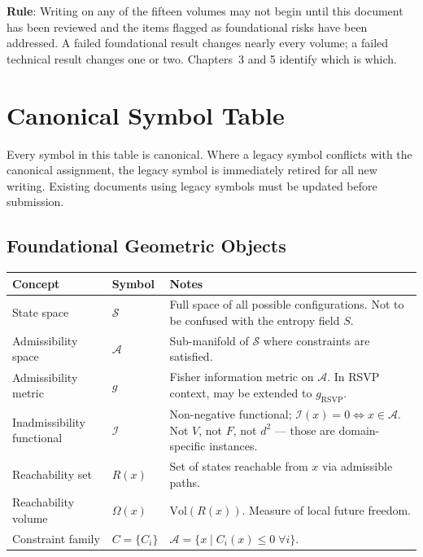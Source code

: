 \documentclass[11pt, a4paper]{book}
\theoremstyle{flyxion}
\theoremstyle{remark}
\begin{document}
\begin{warningbox}
\noindent\textbf{Rule}: Writing on any of the fifteen volumes may not
begin until this document has been reviewed and the items flagged as
foundational risks have been addressed. A failed foundational result
changes nearly every volume; a failed technical result changes one
or two. Chapters~3 and 5 identify which is which.
\end{warningbox}

\tableofcontents

\chapter{Canonical Symbol Table}

Every symbol in this table is canonical. Where a legacy symbol
conflicts with the canonical assignment, the legacy symbol is
immediately retired for all new writing. Existing documents using
legacy symbols must be updated before submission.

\section{Foundational Geometric Objects}

\medskip
\begin{longtable}{p{3.5cm}p{3cm}p{6.5cm}}
\toprule
\textbf{Concept} & \textbf{Symbol} & \textbf{Notes} \\
\midrule
State space & $\mathcal{S}$ & Full space of all possible configurations.
  Not to be confused with the entropy field $S$. \\
Admissibility space & $\mathcal{A}$ & Sub-manifold of $\mathcal{S}$
  where constraints are satisfied. \\
Admissibility metric & $g$ & Fisher information metric on $\mathcal{A}$.
  In RSVP context, may be extended to $g_\mathrm{RSVP}$. \\
Inadmissibility functional & $\mathcal{I}$ & Non-negative functional;
  $\mathcal{I}(x) = 0 \iff x \in \mathcal{A}$. Not $V$, not $F$,
  not $d^2$ — those are domain-specific instances. \\
Reachability set & $R(x)$ & Set of states reachable from $x$ via
  admissible paths. \\
Reachability volume & $\Omega(x)$ & $\mathrm{Vol}(R(x))$. Measure of
  local future freedom. \\
Constraint family & $C = \{C_i\}$ & $\mathcal{A} = \{x \mid C_i(x)
  \leq 0\;\forall i\}$. \\
\bottomrule
\end{longtable}
\end{document}
